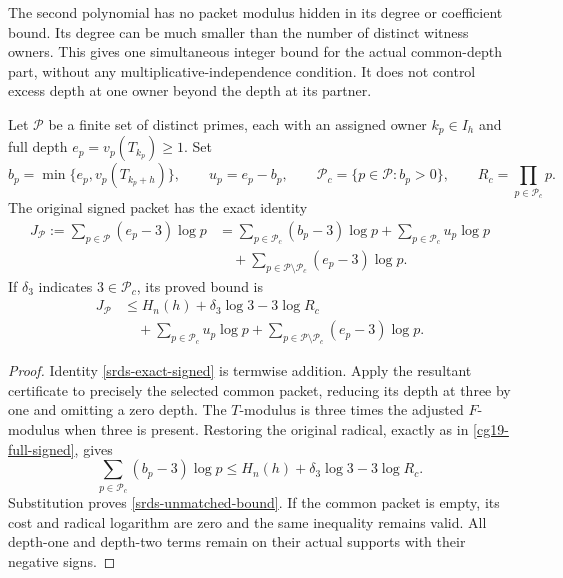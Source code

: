 The second polynomial has no packet modulus hidden in its degree
or coefficient bound. Its degree can be much smaller than the
number of distinct witness owners. This gives one simultaneous
integer bound for the actual common-depth part, without any
multiplicative-independence condition. It does not control excess
depth at one owner beyond the depth at its partner.

\begin{proposition}
\label{srds-signed}
Let \(\mathcal P\) be a finite set of distinct primes, each with
an assigned owner \(k_p\in I_h\) and full depth
\(e_p=v_p(T_{k_p})\ge1\). Set
\[
 b_p=\min\{e_p,v_p(T_{k_p+h})\},\qquad u_p=e_p-b_p,\qquad
 \mathcal P_c=\{p\in\mathcal P:b_p>0\},\qquad
 R_c=\prod_{p\in\mathcal P_c}p.
\]
The original signed packet has the exact identity
\begin{equation}
 \begin{split}
 J_{\mathcal P}:=\sum_{p\in\mathcal P}(e_p-3)\log p
   &=\sum_{p\in\mathcal P_c}(b_p-3)\log p
       +\sum_{p\in\mathcal P_c}u_p\log p\\
   &\quad+\sum_{p\in\mathcal P\setminus\mathcal P_c}
                    (e_p-3)\log p.
 \end{split}
 \label{srds-exact-signed}
\end{equation}
If \(\delta_3\) indicates \(3\in\mathcal P_c\), its proved bound is
\begin{equation}
 \begin{split}
 J_{\mathcal P}
 &\le H_n(h)+\delta_3\log3-3\log R_c\\
 &\quad+\sum_{p\in\mathcal P_c}u_p\log p
       +\sum_{p\in\mathcal P\setminus\mathcal P_c}
                    (e_p-3)\log p.
 \end{split}
 \label{srds-unmatched-bound}
\end{equation}
\end{proposition}
\begin{proof}
Identity \eqref{srds-exact-signed} is termwise addition. Apply the
resultant certificate to precisely the selected common packet,
reducing its depth at three by one and omitting a zero depth.
The \(T\)-modulus is three times the adjusted \(F\)-modulus when
three is present. Restoring the original radical, exactly as in
\eqref{cg19-full-signed}, gives
\[
 \sum_{p\in\mathcal P_c}(b_p-3)\log p
       \le H_n(h)+\delta_3\log3-3\log R_c.
\]
Substitution proves \eqref{srds-unmatched-bound}. If the common
packet is empty, its cost and radical logarithm are zero and the
same inequality remains valid. All depth-one and depth-two terms
remain on their actual supports with their negative signs.
\end{proof}

